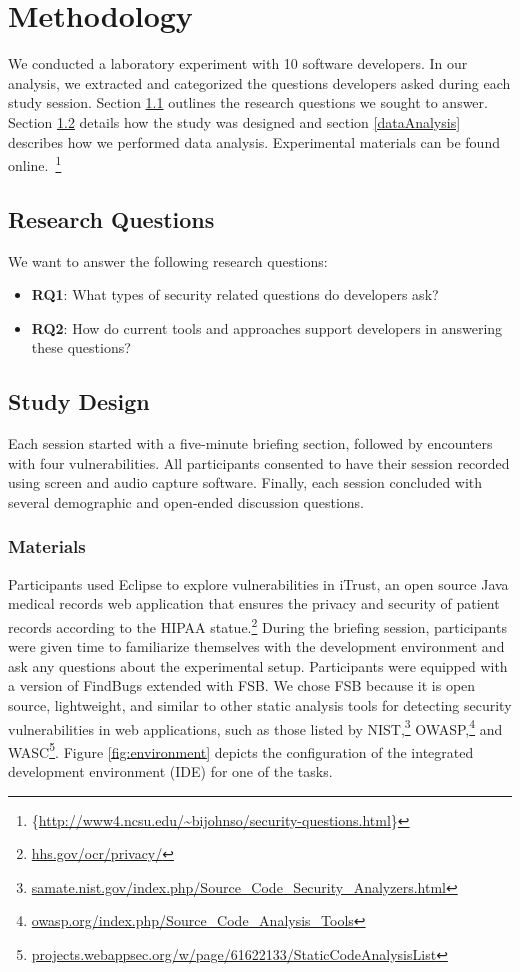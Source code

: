 \documentclass[conference]{IEEEtran}
\newcommand{\blind}[1]{{\color{white}\{#1\}}}
\begin{document}
\section{Methodology}
\label{sec:meth}
We conducted a laboratory experiment with 10 software developers. In our analysis, we extracted and categorized the questions developers asked during each study session. 
Section \ref{rqs} outlines the research questions we sought to answer. 
Section \ref{studyDesign} details how the study was designed and section \ref{dataAnalysis} describes how we performed data analysis.
Experimental materials can be found online.~\footnote{\blind{\url{http://www4.ncsu.edu/~bijohnso/security-questions.html}}}


\subsection{Research Questions}
\label{rqs}
We want to answer the following research questions:
\begin{itemize}
\item \textbf{RQ1}: What types of security related questions do developers ask?
\item \textbf{RQ2}: How do current tools and approaches support developers in answering these questions?
\end{itemize}


\subsection{Study Design}
\label{studyDesign}
Each session started with a five-minute briefing section, followed by encounters with four vulnerabilities.
All participants consented to have their session recorded using screen and audio capture software.
Finally, each session concluded with several demographic and open-ended discussion questions.


\subsubsection{Materials}
	

Participants used Eclipse to explore vulnerabilities in iTrust, an open source Java medical records web application that ensures the privacy and security of patient records according to the HIPAA statue.\footnote{\url{hhs.gov/ocr/privacy/}} 
During the briefing session, participants were given time to familiarize themselves with the development environment and ask any questions about the experimental setup.
Participants were equipped with a version of FindBugs extended with FSB.
We chose FSB because it is open source, lightweight, and similar to other static analysis tools for detecting security vulnerabilities in web applications, such as those listed by NIST,\footnote{\url{samate.nist.gov/index.php/Source_Code_Security_Analyzers.html}} OWASP,\footnote{\url{owasp.org/index.php/Source_Code_Analysis_Tools}} and WASC\footnote{\url{projects.webappsec.org/w/page/61622133/StaticCodeAnalysisList}}.
Figure \ref{fig:environment} depicts the configuration of the integrated development environment (IDE) for one of the tasks.
\end{document}

